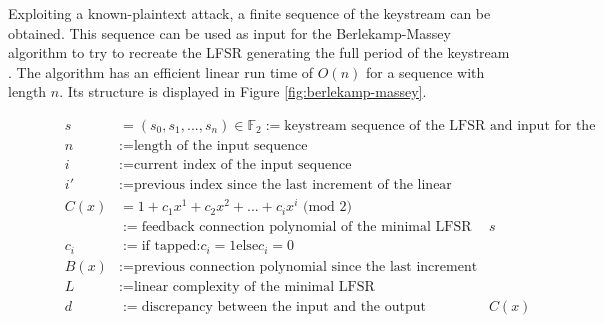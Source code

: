 Exploiting a known-plaintext attack, a finite sequence of the keystream can be obtained. This sequence can be used as input for the Berlekamp-Massey algorithm to try to recreate the LFSR generating the full period of the keystream \cite[p. 232]{Smart.2016}. The algorithm has an efficient linear run time of $O(n)$ for a sequence with length $n$. Its structure is displayed in Figure \ref{fig:berlekamp-massey}.  \\

\begin{figure}[ht]
	
	\[\begin{array}{lll}
		& s &= (s_0, s_1, ..., s_n) \in \mathbb{F}_2 := \text{keystream sequence of the LFSR and input for the algorithm}\\
		& n &:= \text{length of the input sequence}\\
		& i &:= \text{current index of the input sequence}\\
		& i' &:= \text{previous index since the last increment of the linear complexity}\\
		& C(x) & = 1 + c_1x^1 + c_2x^2 + ... + c_ix^i \text{ (mod 2)} \\
		& & := \text{feedback connection polynomial of the minimal LFSR generating } s\\
		& c_i &:= \text{if tapped:} c_i = 1 \text{else} c_i = 0 \\
		& B(x) &:= \text{previous connection polynomial since the last increment of the linear complexity}\\
		& L &:= \text{linear complexity of the minimal LFSR}\\
		& d &:= \text{discrepancy between the input and the output generated by } C(x)\\
	\end{array}\]
	

\end{figure}
